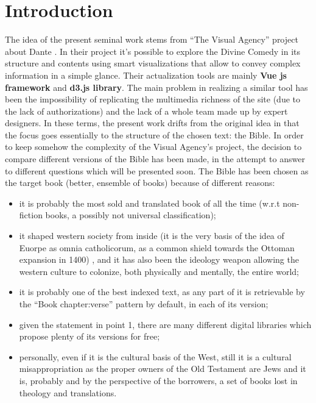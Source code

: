 \documentclass[sigchi]{article}
\begin{document}
\section*{Introduction}
The idea of the present seminal work stems from “The Visual Agency” project about Dante \cite{dante}. In their project it’s possible to explore the Divine Comedy in its structure and contents using smart visualizations that allow to convey complex information in a simple glance. Their actualization tools are mainly \textbf{Vue js framework} and \textbf{d3.js library}.
The main problem in realizing a similar tool has been the impossibility of replicating the multimedia richness of the site (due to the lack of authorizations) and the lack of a whole team made up by expert designers.
In these terms, the present work drifts from the original idea in that the focus goes essentially to the structure of the chosen text: the Bible. In order to keep somehow the complexity of the Visual Agency’s project, the decision to compare different versions of the Bible has been made, in the attempt to answer to different questions which will be presented soon.
The Bible has been chosen as the target book (better, ensemble of books) because of different reasons:
\begin{itemize}
    \item it is probably the most sold and translated book of all the time (w.r.t non-fiction books, a possibly not universal classification);
\item it shaped western society from inside (it is the very basis of the idea of Euorpe as omnia catholicorum, as a common shield towards the Ottoman expansion in 1400) ,  and it has also been the ideology weapon allowing the western culture to colonize, both physically and mentally, the entire world;
\item it is probably one of the best indexed text, as any part of it is retrievable by the “Book chapter:verse” pattern by default, in each of its version;
\item given the statement in point 1, there are many different digital libraries which propose plenty of its versions for free;
\item personally, even if it is the cultural basis of the West, still it is a cultural misappropriation as the proper owners of the Old Testament are Jews and it is, probably and by the perspective of the borrowers, a set of books lost in theology and translations.
\end{itemize}
\end{document}
